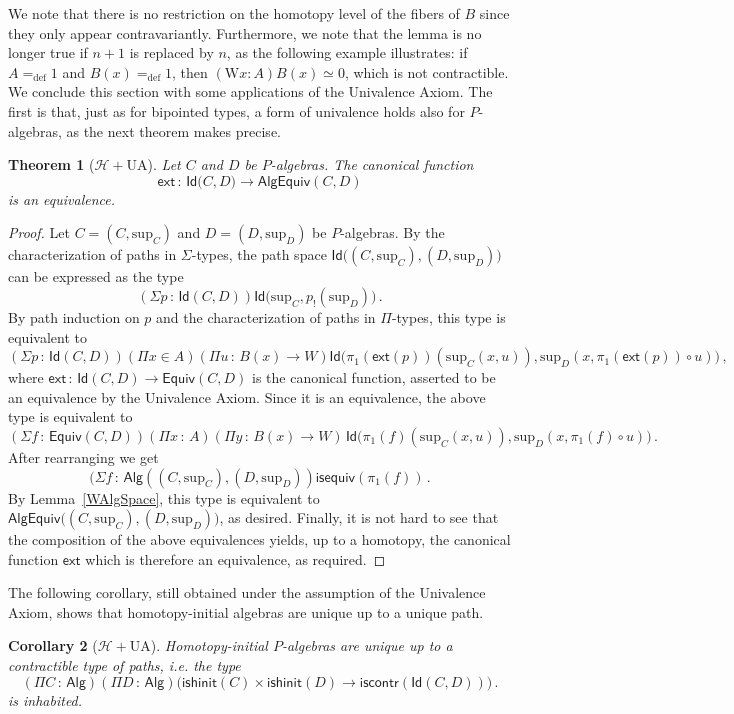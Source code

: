 \documentclass[10pt,a4paper,oneside,reqno]{amsart}
\numberwithin{equation}{section}
\theoremstyle{mythm}
\newtheorem{theorem}{Theorem}[section]
\newtheorem{corollary}[theorem]{Corollary}
\theoremstyle{mydef}
\theoremstyle{myrmk}
\newcommand{\defeq}{=_{\mathrm{def}}}
\newcommand{\co}{\,{:}\,}
\newcommand{\Hint}{\mathcal{H}}
\newcommand{\UA}{\mathrm{UA}}
\newcommand{\iscontr}{\mathsf{iscontr}}
\newcommand{\isequiv}{\mathsf{isequiv}}
\newcommand{\isalghinit}{\mathsf{ishinit}}
\newcommand{\ext}{\mathsf{ext}}
\newcommand{\Id}{\mathsf{Id}}
\newcommand{\W}{\mathrm{W}}
\newcommand{\Palg}{\mathsf{Alg}}
\renewcommand{\sup}{\mathrm{sup}}
\newcommand{\AlgEquiv}{\mathsf{AlgEquiv}}
\begin{document}
We note that there is no restriction on the homotopy level of the fibers of $B$ since they only appear contravariantly. Furthermore, we note that the lemma is no longer true if $n+1$ is replaced by $n$, as the following example
illustrates: if $A \defeq 1$ and $B(x) \defeq 1$, then $(\W x:A) B(x) \simeq 0$, which is not contractible. 
We conclude this section with some applications of the Univalence Axiom. The first is that, just as for bipointed 
types, a form of univalence holds also for $P$-algebras, as the next theorem makes precise. 


\begin{theorem}[$\Hint + \UA$] \label{thm:Punivalence}
Let $C$ and $D$ be $P$-algebras. The canonical function
\[ 
\ext \co \Id \big(C,D\big) \to  \AlgEquiv(C,D) 
\]
is an equivalence.
\end{theorem}

\begin{proof} 
Let $C = (C,\sup_C)$ and $D= (D,\sup_D)$ be $P$-algebras. By the characterization of paths in $\Sigma$-types, the path space 
$\Id \big( (C,\sup_C) ,  (D,\sup_D) \big)$ can be expressed as the type
\[
(\Sigma p \co \Id(C, D)) \Id \big( \sup_C ,  p_{!}(\sup_D)  \big) \, .
\]
By path induction on $p$ and the characterization of paths in $\Pi$-types, this type is equivalent to
\[  
(\Sigma p \co \Id(C,D))
(\Pi x \in A) 
(\Pi u \co B(x) \to W)
\Id \big(  \pi_1(\ext(p))( \sup_C(x,u)),  \sup_D(x, \pi_1(\ext (p)) \circ u) \big) \, , 
\]
where $\ext \co \Id(C,D) \to \mathsf{Equiv}(C,D)$ is the canonical function, asserted to be an equivalence by the Univalence Axiom. Since it is an equivalence, the above type is equivalent to
\[
(\Sigma f \co \mathsf{Equiv}(C,D)) 
(\Pi x  \co A) 
(\Pi y \co B(x) \to W) \, 
\Id \big( \pi_1(f) (\sup_C(x,u))  , \sup_D (x, \pi_1(f) \circ u) \big) \, .
\]
After rearranging we get
\[
(\Sigma f \co \Palg ( (C,\sup_C),  (D,\sup_D) ) \isequiv(\pi_1(f)) \, .
\]
By Lemma~\ref{WAlgSpace}, this type is equivalent to $\AlgEquiv \big( (C,\sup_C),  (D,\sup_D)\big)$, as desired. Finally, it is not hard to see that the composition of the above equivalences yields, up to a homotopy, the canonical function $\ext$ which is therefore an equivalence, as required.
\end{proof} 

The following corollary, still obtained under the assumption of the Univalence Axiom, shows that
homotopy-initial algebras are unique up to a unique path.

\begin{corollary}[$\Hint + \UA$] \label{WHInitIso}
Homotopy-initial $P$-algebras are unique up to a  contractible type of paths, i.e. the type
\[ 
(\Pi C \co \Palg) (\Pi D \co \Palg) \big( \isalghinit(C) \times \isalghinit(D)  \to 
\iscontr(\Id(C,D)) \big) \, .
\] 
is inhabited.
\end{corollary}
\end{document}
